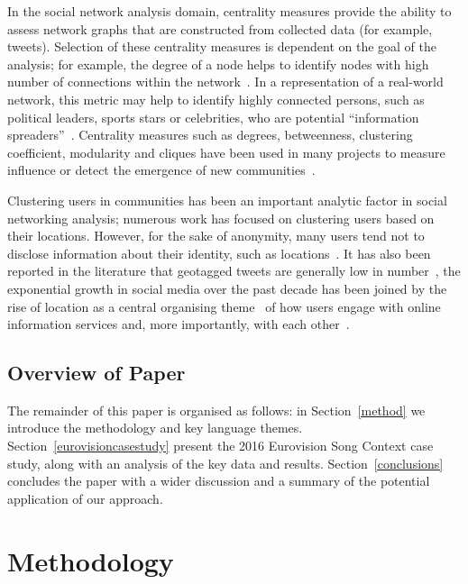 \documentclass{llncs}
\begin{document}
In the social network analysis domain, centrality measures
provide the ability to assess network graphs that are constructed from
collected data (for example, tweets). Selection of these centrality
measures is dependent on the goal of the analysis; for example, the
degree of a node helps to identify nodes with high number of connections
within the
network~\cite{borgatti+everett:2000,rombach-et-al:2014,liu-et-al:2014}.
In a representation of a real-world network, this metric may help to
identify highly connected persons, such as political leaders, sports
stars or celebrities, who are potential ``information
spreaders''~\cite{cha-et-al:2012,borge-holthoefer-et-al:2012,zhang-et-al:2016}.
Centrality measures such as degrees, betweenness, clustering
coefficient, modularity and cliques have been used in many projects to
measure influence or detect the emergence of new
communities~\cite{willis-et-al:2015,oatley+crick:2015}.

Clustering users in communities has been an important analytic factor
in social networking analysis; numerous work has focused on clustering
users based on their locations. However, for the sake of anonymity,
many users tend not to disclose information about their identity, such
as locations~\cite{kang-et-al:2013}. It has also been reported in the
literature that geotagged tweets are generally low in
number~\cite{morstatter-et-al:2013,tan-et-al:2013,kumar-et-al:2014},
the exponential growth in social media over the past decade has been
joined by the rise of location as a central organising
theme~\cite{liang-et-al:2013} of how users engage with online
information services and, more importantly, with each
other~\cite{cheng-et-al:2010,caverlee-et-al:2013}.

\subsection{Overview of Paper}

The remainder of this paper is organised as follows: in
Section~\ref{method} we introduce the methodology and key language
themes.  Section~\ref{eurovisioncasestudy} present the 2016 Eurovision
Song Context case study, along with an analysis of the key data and
results. Section~\ref{conclusions} concludes the paper with a wider
discussion and a summary of the potential application of our approach.


\section{Methodology}\label{methodology}
\end{document}

